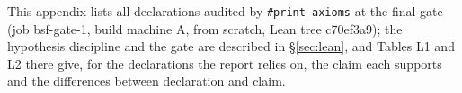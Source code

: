 This appendix lists all \GateAudited{} declarations audited by \texttt{\#print axioms} at the final gate (job bsf-gate-1, build machine A,
from scratch, Lean tree c70ef3a9);
the hypothesis discipline and the gate are described in \S\ref{sec:lean}, and Tables L1 and L2 there give, for the
declarations the report relies on, the claim each supports and the differences between declaration and claim.

